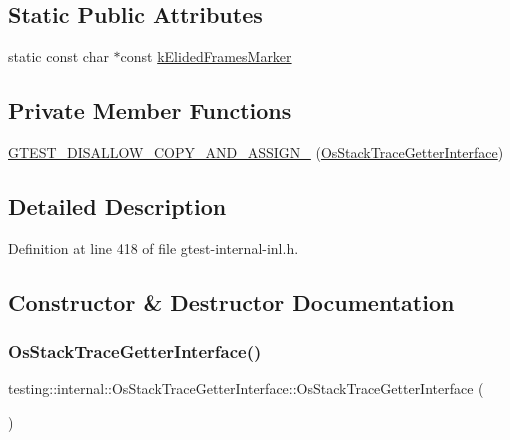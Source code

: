 \subsection*{Static Public Attributes}
\begin{DoxyCompactItemize}
\item 
static const char $\ast$const \hyperlink{classtesting_1_1internal_1_1OsStackTraceGetterInterface_a669c49ce9ae05935e70bddb35a81ceb8}{k\+Elided\+Frames\+Marker}
\end{DoxyCompactItemize}
\subsection*{Private Member Functions}
\begin{DoxyCompactItemize}
\item 
\hyperlink{classtesting_1_1internal_1_1OsStackTraceGetterInterface_a7c3ad7c30af28080d7be852886ac3af0}{G\+T\+E\+S\+T\+\_\+\+D\+I\+S\+A\+L\+L\+O\+W\+\_\+\+C\+O\+P\+Y\+\_\+\+A\+N\+D\+\_\+\+A\+S\+S\+I\+G\+N\+\_\+} (\hyperlink{classtesting_1_1internal_1_1OsStackTraceGetterInterface}{Os\+Stack\+Trace\+Getter\+Interface})
\end{DoxyCompactItemize}


\subsection{Detailed Description}


Definition at line 418 of file gtest-\/internal-\/inl.\+h.



\subsection{Constructor \& Destructor Documentation}
\mbox{\label{classtesting_1_1internal_1_1OsStackTraceGetterInterface_afbe9eb0ca8775fbb98ff0720011b6708}} 
\subsubsection{\texorpdfstring{Os\+Stack\+Trace\+Getter\+Interface()}{OsStackTraceGetterInterface()}}
{\footnotesize\ttfamily testing\+::internal\+::\+Os\+Stack\+Trace\+Getter\+Interface\+::\+Os\+Stack\+Trace\+Getter\+Interface (\begin{DoxyParamCaption}{ }\end{DoxyParamCaption})\hspace{0.3cm}{\ttfamily [inline]}}



